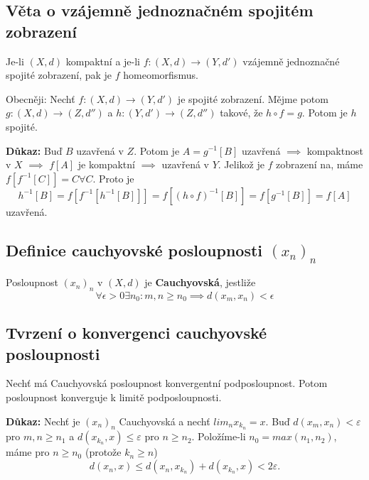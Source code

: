 \documentclass[../main.tex]{subfiles}
\begin{document}
\subsection{Věta o vzájemně jednoznačném spojitém zobrazení}
\hspace{1.2mm}
\noindent
Je-li $(X,d)$ kompaktní a je-li $f: (X,d) \to (Y,d')$ vzájemně jednoznačné spojité zobrazení, pak je
$f$ homeomorfismus.

\vspace{2mm}
\hspace{1.2mm}
{\small
Obecněji: Nechť $f:(X,d) \to (Y,d')$ je spojité zobrazení. Mějme potom $g: (X,d) \to (Z, d'')$ a
$h: (Y,d') \to (Z,d'')$ takové, že $h \circ f = g$. Potom je $h$ spojité.}

\vspace{5mm}
\noindent
\textbf{Důkaz:} Buď $B$ uzavřená v $Z$. Potom je $A = g^{-1}[B]$ uzavřená $\implies$ kompaktnost v $X$ $\implies$ $f[A]$ je kompaktní $\implies$ uzavřená v $Y$. Jelikož  je $f$ zobrazení na, máme $f[f^{-1}[C]] = C \forall C$. Proto je 
\[h^{-1}[B] = f[f^{-1}[h^{-1}[B]]] = f[(h \circ f)^{-1}[B]] = f[g^{-1}[B]] = f[A]\]
uzavřená.

\subsection{Definice cauchyovské posloupnosti $(x_n)_n$}
\hspace{1.2mm}
\noindent
Posloupnost $(x_n)_n$ v $(X,d)$ je \textbf{Cauchyovská}, jestliže
\[ \forall \epsilon > 0 \exists n_0: m,n \geq n_0 \implies d(x_m, x_n) < \epsilon \]

\subsection{Tvrzení o konvergenci cauchyovské posloupnosti}
\hspace{1.2mm}
\noindent
Nechť má Cauchyovská posloupnost konvergentní podposloupnost. Potom posloupnost konverguje k limitě
podposloupnosti.

\vspace{5mm}
\noindent
\textbf{Důkaz:} Nechť je $(x_n)_n$ Cauchyovská a nechť $lim_{n}x_{k_n} = x.$ Buď $d(x_m,x_n) < \varepsilon$ pro $m,n \geq n_1$ 
a $d(x_{k_n},x) \leq \varepsilon$ pro $n \geq n_2$. Položíme-li $n_0 = max(n_1,n_2)$, máme pro $n \geq n_0$ (protože $k_n \geq n$)
\[d(x_n,x) \leq d(x_n,x_{k_n}) + d(x_{k_n},x) < 2\varepsilon.\]
\end{document}
